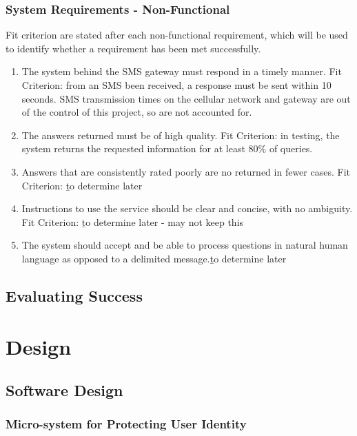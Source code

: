 \documentclass{article}
\begin{document}
\subsubsection{System Requirements - Non-Functional}
Fit criterion are stated after each non-functional requirement, which will be used to identify whether a requirement has been met successfully.
\begin{enumerate}
  \item The system behind the SMS gateway must respond in a timely manner.  Fit Criterion: from an SMS been received, a response must be sent within 10 seconds.  SMS transmission times on the cellular network and gateway are out of the control of this project, so are not accounted for.
  \item The answers returned must be of high quality.  Fit Criterion: in testing, the system returns the requested information for at least 80\% of queries.
  \item Answers that are consistently rated poorly are no returned in fewer cases.  Fit Criterion: {\b to determine later}%
  \item Instructions to use the service should be clear and concise, with no ambiguity.  Fit Criterion: {\b to determine later - may not keep this}%
  \item The system should accept and be able to process questions in natural human language as opposed to a delimited message.{\b to determine later}%
\end{enumerate}

\subsection{Evaluating Success}

\newpage
\section{Design}
\label{sec:design}

\subsection{Software Design}

\subsubsection{Micro-system for Protecting User Identity}
\end{document}
